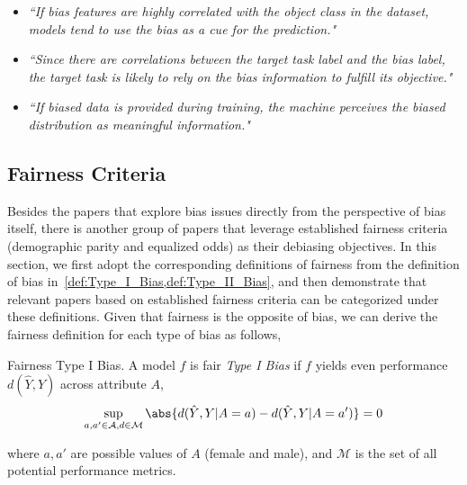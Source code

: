 \begin{itemize}
    \item \emph{``If bias features are highly correlated with the object class in the  dataset, models tend to use the bias as a cue for the prediction."}~\cite{BCL}
    \item \emph{``Since there are correlations between the target task label and the bias label, the target task is likely to rely on the bias information to fulfill its objective."}~\cite{CSAD}
    \item \emph{``If biased data is provided during training, the machine perceives the biased distribution as meaningful information."}~\cite{learn_not_to_learn_Colored_MNIST}
\end{itemize}



















\subsection{Fairness Criteria}
Besides the papers that explore bias issues directly from the perspective of bias itself, there is another group of papers that leverage established fairness criteria (\eg demographic parity and equalized odds) as their debiasing objectives.
In this section, we first adopt the corresponding definitions of fairness from the definition of bias in~\cref{def:Type_I_Bias,def:Type_II_Bias}, and then demonstrate that relevant papers based on established fairness criteria can be categorized under these definitions.
Given that fairness is the opposite of bias, we can derive the fairness definition for each type of bias as follows,

\begin{definition}
    \label{def:Fairness_Type_I_Bias}
Fairness \wrt Type I Bias. A model $f$ is fair \wrt \emph{Type I Bias} if $f$ yields even performance $d(\hat{Y},Y)$ across attribute $A$, \ie
\begin{align}
    \sup_{a,a'\in \mathcal{A}, d \in \mathcal{M}} \abs{d(\hat{Y},Y|A=a) - d(\hat{Y},Y|A=a')} = 0
\end{align}
\end{definition}
\noindent
where $a,a'$ are possible values of $A$ (\eg female and male), and $\mathcal{M}$ is the set of all potential performance metrics.

